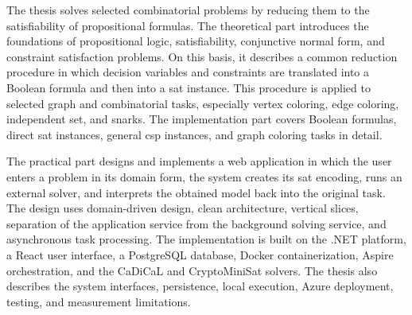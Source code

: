 The thesis solves selected combinatorial problems by reducing them to the satisfiability of propositional formulas. The theoretical part introduces the foundations of propositional logic, satisfiability, conjunctive normal form, and constraint satisfaction problems. On this basis, it describes a common reduction procedure in which decision variables and constraints are translated into a Boolean formula and then into a \acrshort{sat} instance. This procedure is applied to selected graph and combinatorial tasks, especially vertex coloring, edge coloring, independent set, and snarks. The implementation part covers Boolean formulas, direct \acrshort{sat} instances, general \acrshort{csp} instances, and graph coloring tasks in detail.

The practical part designs and implements a web application in which the user enters a problem in its domain form, the system creates its \acrshort{sat} encoding, runs an external solver, and interprets the obtained model back into the original task. The design uses domain-driven design, clean architecture, vertical slices, separation of the application service from the background solving service, and asynchronous task processing. The implementation is built on the .NET platform, a React user interface, a PostgreSQL database, Docker containerization, Aspire orchestration, and the CaDiCaL and CryptoMiniSat solvers. The thesis also describes the system interfaces, persistence, local execution, Azure deployment, testing, and measurement limitations.
